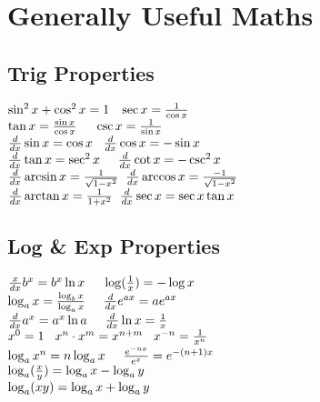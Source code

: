 \section{Generally Useful Maths}
\subsection*{Trig Properties}
$\sin^2x + \cos^2x = 1 \hspace{3mm} \sec x = \frac{1}{\cos x}$\\
$\tan x = \frac{\sin x}{\cos x} \hspace{5mm} \csc x = \frac{1}{\sin x}$\\
$\frac{d}{dx}\sin x= \cos x \hspace{3mm} \frac{d}{dx}\cos x= - \sin x$\\
$\frac{d}{dx}\tan x = \sec^2 x \hspace{5mm} \frac{d}{dx}\cot x = - \csc^2 x$\\
$\frac{d}{dx} \arcsin x = \frac{1}{\sqrt{1 - x^2}}  \hspace{2mm}   \frac{d}{dx} \arccos x = \frac{-1}{\sqrt{1 - x^2}}  $\\
$\frac{d}{dx} \arctan x = \frac{1}{1 + x^2} \hspace{2mm} \frac{d}{dx} \sec x = \sec x \tan x $\\

\subsection*{Log \& Exp Properties}
$\frac{x}{dx} b^x = b^x \ln x \hspace{5mm} \log(\frac{1}{x}) = - \log x$\\
$\log_ax = \frac{\log_bx}{\log_ax} \hspace{5mm} \frac{d}{dx}e^{ax} = ae^{ax}$\\
$\frac{d}{dx}a^{x} = a^{x} \ln a \hspace{5mm} \frac{d}{dx} \ln x = \frac{1}{x} $\\
$x^0 = 1 \hspace{3mm} x^n \cdot x^m = x^{n+m} \hspace{3mm} x^{-n} = \frac{1}{x^n}    $\\
$\log_a x^n = n \log_a x \hspace{5mm} \frac{e^{-n x}}{e^x} = e^{-(n+1)x}    $\\
$\log_a (\frac{x}{y}) = \log_a x - \log_a y \hspace{2mm}  $\\
$\log_a (xy) = \log_a x + \log_a y \hspace{2mm}  $\\

